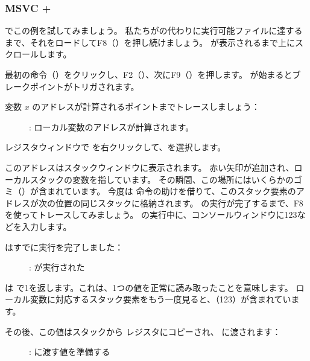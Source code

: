 \clearpage
\subsubsection{MSVC + \olly}
\myindex{\olly}

\olly でこの例を試してみましょう。 
私たちがの代わりに実行可能ファイルに達するまで、それをロードしてF8（\stepover）を押し続けましょう。
\main が表示されるまで上にスクロールします。

最初の命令（）をクリックし、F2（）、次にF9（）を押します。 
\main が始まるとブレークポイントがトリガされます。

変数 $x$ のアドレスが計算されるポイントまでトレースしましょう：

\begin{figure}[H]
\centering
{}
\caption{\olly: ローカル変数のアドレスが計算されます。}
\label{fig:scanf_ex1_olly_1}
\end{figure}

レジスタウィンドウで \EAX を右クリックして、を選択します。

このアドレスはスタックウィンドウに表示されます。 
赤い矢印が追加され、ローカルスタックの変数を指しています。 
その瞬間、この場所にはいくらかのゴミ（）が含まれています。 
今度は \PUSH 命令の助けを借りて、このスタック要素のアドレスが次の位置の同じスタックに格納されます。 
\scanf の実行が完了するまで、F8を使ってトレースしてみましょう。 
\scanf の実行中に、コンソールウィンドウに123などを入力します。



\clearpage
\scanf はすでに実行を完了しました：

\begin{figure}[H]
\centering
{}
\caption{\olly: \scanf が実行された}
\label{fig:scanf_ex1_olly_3}
\end{figure}

\scanf は \EAX で1を返します。これは、1つの値を正常に読み取ったことを意味します。 
ローカル変数に対応するスタック要素をもう一度見ると、（123）が含まれています。

\clearpage

その後、この値はスタックから \ECX レジスタにコピーされ、 \printf に渡されます：

\begin{figure}[H]
\centering
{}
\caption{\olly: \printf に渡す値を準備する}
\label{fig:scanf_ex1_olly_4}
\end{figure}
